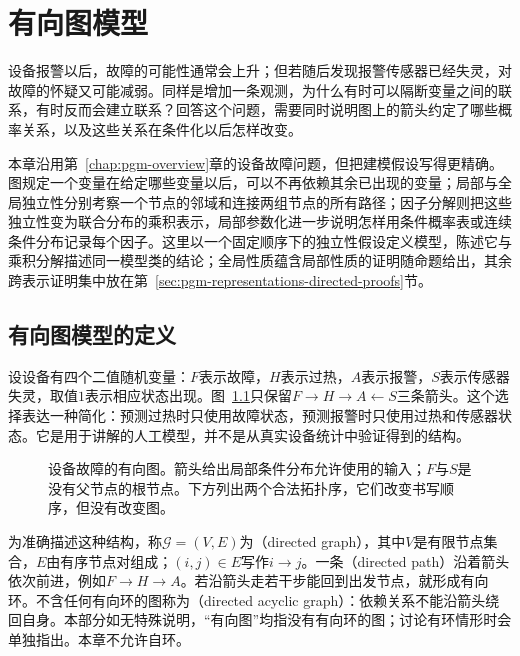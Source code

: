 \chapter{有向图模型}
\label{chap:pgm-directed}

设备报警以后，故障的可能性通常会上升；但若随后发现报警传感器已经失灵，对故障的怀疑又可能减弱。同样是增加一条观测，为什么有时可以隔断变量之间的联系，有时反而会建立联系？回答这个问题，需要同时说明图上的箭头约定了哪些概率关系，以及这些关系在条件化以后怎样改变。

本章沿用第~\ref{chap:pgm-overview}章的设备故障问题，但把建模假设写得更精确。图规定一个变量在给定哪些变量以后，可以不再依赖其余已出现的变量；局部与全局独立性分别考察一个节点的邻域和连接两组节点的所有路径；因子分解则把这些独立性变为联合分布的乘积表示，局部参数化进一步说明怎样用条件概率表或连续条件分布记录每个因子。这里以一个固定顺序下的独立性假设定义模型，陈述它与乘积分解描述同一模型类的结论；全局性质蕴含局部性质的证明随命题给出，其余跨表示证明集中放在第~\ref{sec:pgm-representations-directed-proofs}节。

\section{有向图模型的定义}
\label{sec:pgm-directed-definition}

设设备有四个二值随机变量：$F$表示故障，$H$表示过热，$A$表示报警，$S$表示传感器失灵，取值$1$表示相应状态出现。图~\ref{fig:pgm-directed-device}只保留$F\to H\to A\leftarrow S$三条箭头。这个选择表达一种简化：预测过热时只使用故障状态，预测报警时只使用过热和传感器状态。它是用于讲解的人工模型，并不是从真实设备统计中验证得到的结构。

\begin{figure}[htbp]
  \centering
  
  \caption{设备故障的有向图。箭头给出局部条件分布允许使用的输入；$F$与$S$是没有父节点的根节点。下方列出两个合法拓扑序，它们改变书写顺序，但没有改变图。}
  \label{fig:pgm-directed-device}
\end{figure}

为准确描述这种结构，称$\mathcal{G}=(V,E)$为（directed graph），其中$V$是有限节点集合，$E$由有序节点对组成；$(i,j)\in E$写作$i\to j$。一条（directed path）沿着箭头依次前进，例如$F\to H\to A$。若沿箭头走若干步能回到出发节点，就形成有向环。不含任何有向环的图称为（directed acyclic graph）：依赖关系不能沿箭头绕回自身。本部分如无特殊说明，“有向图”均指没有有向环的图；讨论有环情形时会单独指出。本章不允许自环。

